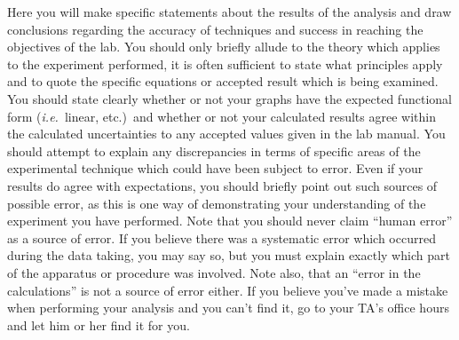 Here you will make specific statements about the results of the
analysis and draw conclusions regarding the accuracy of techniques and success 
in reaching the objectives of the lab.  You should only briefly allude to the 
theory which applies to the experiment performed,  it is often sufficient to 
state what principles apply and to quote the specific equations or accepted
result which is being examined.  You should state clearly whether or not your
graphs have the expected functional form ({\it i.e.}\ linear, etc.)\ and 
whether or not your calculated results agree within the calculated 
uncertainties to any accepted values given in the lab manual.  You should 
attempt to explain any discrepancies in terms of specific areas of the 
experimental technique which could have been subject to error.  Even if your 
results do agree with expectations, you should briefly point out such sources 
of possible error,  as this is one way of demonstrating your understanding of 
the experiment you have performed.  Note that you should never claim ``human 
error'' as a source of error.  If you believe there was a systematic error 
which occurred during the data taking, you may say so, but you must explain 
exactly which part of the apparatus or procedure was involved. Note also, that 
an ``error in the calculations'' is not a source of error either.  If you 
believe you've made a mistake when performing your analysis and you can't find 
it, go to your TA's office hours and let him or her find it for you.   

